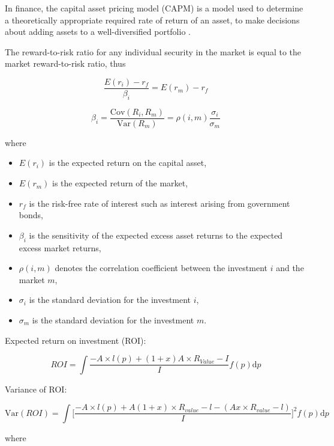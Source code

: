 \documentclass{mcmthesis}
\begin{document}
In finance, the capital asset pricing model (CAPM) is a model used to determine a theoretically
appropriate required rate of return of an asset, to make decisions about adding assets
to a well-diversified portfolio \cite{li2002}.

The reward-to-risk ratio for any individual security in the market is equal to the market
reward-to-risk ratio, thus

\begin{equation}
\frac{E(r_i)-r_f}{\beta_i} = E(r_m)-r_f
\end{equation}

\begin{equation}
\beta_i = \frac{\mathrm{Cov}(R_i,R_m)}{\mathrm{Var}(R_m)} = \rho(i,m) \frac{\sigma_i}{\sigma_m}
\end{equation}

\noindent where

\begin{itemize}
\item $E(r_{i})$ is the expected return on the capital asset,
\item $E(r_{m})$ is the expected return of the market,
\item $r_{f}$ is the risk-free rate of interest such as interest arising from government bonds,
\item $\beta_{i}$ is the sensitivity of the expected excess asset returns to the expected excess market returns,
\item $\rho(i,m)$ denotes the correlation coefficient between the investment $i$ and the market $m$,
\item $\sigma_{i}$ is the standard deviation for the investment $i$,
\item $\sigma_m$ is the standard deviation for the investment $m$.
\end{itemize}

Expected return on investment (ROI):

\begin{equation}
ROI = \int \frac{-A \times l(p)+(1+x)A \times R_{Value}-I}{I}f(p) \mathrm{d}p
\end{equation}

Variance of ROI:

\begin{equation}
\mathrm{Var}(ROI) = \int \bigg[\frac{-A \times l(p)+A(1+x) \times R_{value}-l-(Ax \times 
R_{value}-l)}{I}\bigg]^2 f(p) \mathrm{d}p
\end{equation}

\noindent where
\end{document}

